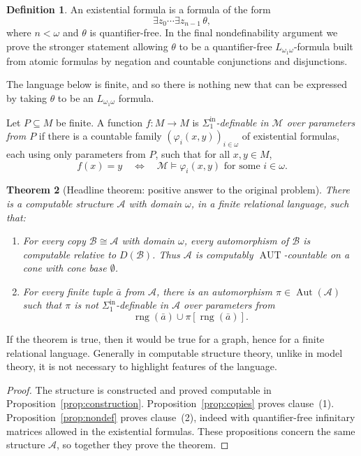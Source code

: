 \documentclass[12pt]{article}
\newtheorem{theorem}{Theorem}[section]
\theoremstyle{definition}
\newtheorem{definition}[theorem]{Definition}
\theoremstyle{remark}
\newcommand{\Aut}{\operatorname{Aut}}
\newcommand{\rng}{\operatorname{rng}}
\newcommand{\review}[1]{\begin{reviewbox}#1\end{reviewbox}}
\begin{document}
\begin{definition}
An existential formula is a formula of the form
\[
\exists z_0\cdots \exists z_{n-1}\,\theta,
\]
where \(n<\omega\) and \(\theta\) is quantifier-free.  In the final nondefinability argument we prove the stronger statement allowing \(\theta\) to be a quantifier-free \(L_{\omega_1\omega}\)-formula built from atomic formulas by negation and countable conjunctions and disjunctions.

\review{The language below is finite, and so there is nothing new that can be expressed by taking $\theta$ to be an $L_{\omega_1 \omega}$ formula.}

Let \(P\subseteq M\) be finite.  A function \(f:M\to M\) is \emph{\(\Sigma^{\mathrm{in}}_1\)-definable in \(\mathcal M\) over parameters from \(P\)} if there is a countable family \((\varphi_i(x,y))_{i\in\omega}\) of existential formulas, each using only parameters from \(P\), such that for all \(x,y\in M\),
\[
f(x)=y
\quad\Longleftrightarrow\quad
\mathcal M\models \varphi_i(x,y)\text{ for some }i\in\omega.
\]
\end{definition}

\begin{theorem}[Headline theorem: positive answer to the original problem]\label{thm:main}
There is a computable structure \(\mathcal A\) with domain \(\omega\), in a finite relational language, such that:
\begin{enumerate}
\item For every copy \(\mathcal B\cong\mathcal A\) with domain \(\omega\), every automorphism of \(\mathcal B\) is computable relative to \(D(\mathcal B)\).  Thus \(\mathcal A\) is computably \(\operatorname{AUT}\)-countable on a cone with cone base \(\emptyset\).
\item For every finite tuple \(\bar a\) from \(\mathcal A\), there is an automorphism \(\pi\in\Aut(\mathcal A)\) such that \(\pi\) is not \(\Sigma^{\mathrm{in}}_1\)-definable in \(\mathcal A\) over parameters from
\[
\rng(\bar a)\cup \pi[\rng(\bar a)].
\]
\end{enumerate}
\end{theorem}

\review{If the theorem is true, then it would be true for a graph, hence for a finite relational language. Generally in computable structure theory, unlike in model theory, it is not necessary to highlight features of the language.}

\begin{proof}
The structure is constructed and proved computable in Proposition~\ref{prop:construction}.  Proposition~\ref{prop:copies} proves clause~(1).  Proposition~\ref{prop:nondef} proves clause~(2), indeed with quantifier-free infinitary matrices allowed in the existential formulas.  These propositions concern the same structure \(\mathcal A\), so together they prove the theorem.
\end{proof}
\end{document}
